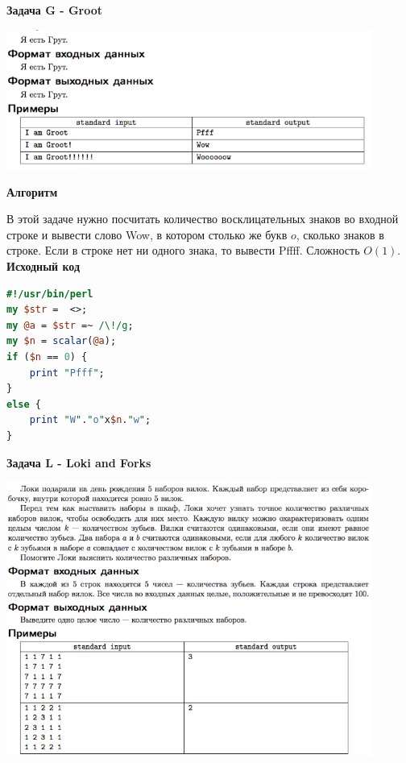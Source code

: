 \documentclass[a4paper,12pt]{article}
\begin{document}
\newpage
\textbf{{\large Задача G - Groot}}

\begin{center}
\includegraphics[width=0.9\textwidth]{OC_YKB/G.png}\\ [1cm]
\end{center}

\textbf{{\large Алгоритм}}

В этой задаче нужно посчитать количество восклицательных знаков во входной строке и вывести слово Wow, в котором столько же букв $o$, сколько знаков в строке. Если в строке нет ни одного знака, то вывести Pffff. Сложность $O(1)$. \\

\textbf{{\large Исходный код}} \\
\begin{lstlisting}[language=Perl]
#!/usr/bin/perl
my $str =  <>;
my @a = $str =~ /\!/g;
my $n = scalar(@a);
if ($n == 0) {
	print "Pfff";
}
else {
	print "W"."o"x$n."w";
}
\end{lstlisting}


\newpage
\textbf{{\large Задача L - Loki and Forks}}

\begin{center}
\includegraphics[width=0.9\textwidth]{OC_YKB/L.png}\\ [1cm]
\end{center}
\end{document}
